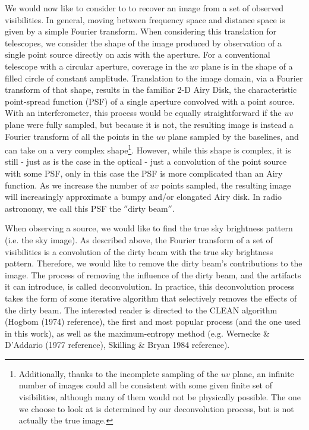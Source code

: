 We would now like to consider to to recover an image from a set of observed visibilities. In general, moving between frequency space and distance space is given by a simple Fourier transform. When considering this translation for telescopes, we consider the shape of the image produced by observation of a single point source directly on axis with the aperture. For a conventional telescope with a circular aperture, coverage in the $uv$ plane is in the shape of a filled circle of constant amplitude. Translation to the image domain, via a Fourier transform of that shape, results in the familiar 2-D Airy Disk, the characteristic point-spread function (PSF) of a single aperture convolved with a point source. With an interferometer, this process would be equally straightforward if the $uv$ plane were fully sampled, but because it is not, the resulting image is instead a Fourier transform of all the points in the $uv$ plane sampled by the baselines, and can take on a very complex shape\footnote{Additionally, thanks to the incomplete sampling of the $uv$ plane, an infinite number of images could all be consistent with some given finite set of visibilities, although many of them would not be physically possible. The one we choose to look at is determined by our deconvolution process, but is not actually the true image.}. However, while this shape is complex, it is still - just as is the case in the optical - just a convolution of the point source with some PSF, only in this case the PSF is more complicated than an Airy function. As we increase the number of $uv$ points sampled, the resulting image will increasingly approximate a bumpy and/or elongated Airy disk. In radio astronomy, we call this PSF the $''$dirty beam$''$.


When observing a source, we would like to find the true sky brightness pattern (i.e. the sky image). As described above, the Fourier transform of a set of visibilities is a convolution of the dirty beam with the true sky brightness pattern. Therefore, we would like to remove the dirty beam's contributions to the image. The process of removing the influence of the dirty beam, and the artifacts it can introduce, is called deconvolution. In practice, this deconvolution process takes the form of some iterative algorithm that selectively removes the effects of the dirty beam. The interested reader is directed to the CLEAN algorithm (Hogbom (1974) reference), the first and most popular process (and the one used in this work), as well as the maximum-entropy method (e.g. Wernecke \& D’Addario (1977 reference), Skilling \& Bryan 1984 reference).


